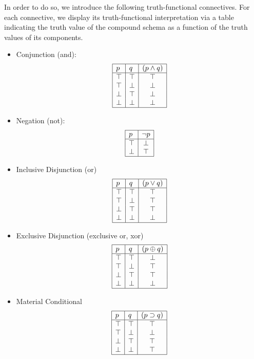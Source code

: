 In order to do so, we introduce the following truth-functional connectives. For each connective, we display its truth-functional interpretation via a table indicating the truth value of the compound schema as a function of the truth values of its components.
\begin{itemize}
\item Conjunction (and):
\[
\begin{array}{|l|l|c|} \hline
p   & q  &  (p \wedge q)   \\ \hline
\top & \top & \top  \\
\top & \bot & \bot  \\
\bot & \top & \bot  \\
\bot & \bot & \bot \\
\hline
\end{array}
\]
\item Negation (not):
\[
\begin{array}{|l|c|} \hline
p   &  \neg p    \\ \hline
\top & \bot  \\
\bot & \top  \\
\hline
\end{array}
\]
\item Inclusive Disjunction (or)
\[
\begin{array}{|l|l|c|} \hline
p   & q  &  (p \vee q)   \\ \hline
\top & \top & \top  \\
\top & \bot & \top  \\
\bot & \top & \top  \\   
\bot & \bot & \bot \\
\hline
\end{array}
\]

\item Exclusive Disjunction (exclusive or, xor)
\[
\begin{array}{|l|l|c|} \hline
p   & q  &  (p \oplus q)   \\ \hline
\top & \top & \bot  \\
\top & \bot & \top  \\
\bot & \top & \top  \\
\bot & \bot & \bot  \\
\hline
\end{array}
\]

\item Material Conditional
\[
\begin{array}{|l|l|c|} \hline
p   & q  &  (p \supset q)   \\ \hline
\top & \top & \top  \\
\top & \bot & \bot  \\
\bot & \top & \top  \\   
\bot & \bot & \top \\
\hline
\end{array}
\]


\end{itemize}
